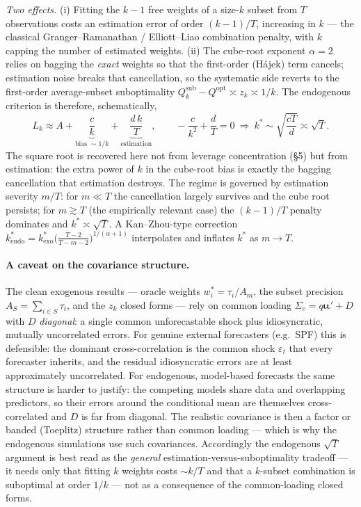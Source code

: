 \documentclass[11pt]{article}
\newcommand{\Sig}{\Sigma_e}
\newcommand{\Qopt}{Q^{\mathrm{opt}}}
\newcommand{\Qsub}{Q_k^{\mathrm{sub}}}
\newcommand{\iotab}{\bm{\iota}}
\begin{document}
\emph{Two effects.} (i) Fitting the $k-1$ free weights of a size-$k$ subset from $T$
observations costs an estimation error of order $(k-1)/T$, increasing in $k$ --- the
classical Granger--Ramanathan / Elliott--Liao combination penalty, with $k$ capping the
number of estimated weights. (ii) The cube-root exponent $\alpha=2$ relies on bagging the
\emph{exact} weights so that the first-order (H\'ajek) term cancels; estimation noise breaks
that cancellation, so the systematic side reverts to the first-order average-subset
suboptimality $\Qsub-\Qopt\asymp z_k\asymp1/k$. The endogenous criterion is therefore,
schematically,
\[
  L_k\approx A+\underbrace{\frac{c}{k}}_{\text{bias }\sim1/k}
  +\underbrace{\frac{d\,k}{T}}_{\text{estimation}},\qquad
  -\frac{c}{k^2}+\frac{d}{T}=0\ \Longrightarrow\ k^\ast\sim\sqrt{\frac{cT}{d}}\asymp\sqrt T .
\]
The square root is recovered here not from leverage concentration (\S5) but from estimation:
the extra power of $k$ in the cube-root bias is exactly the bagging cancellation that
estimation destroys. The regime is governed by estimation severity $m/T$: for $m\ll T$ the
cancellation largely survives and the cube root persists; for $m\gtrsim T$ (the empirically
relevant case) the $(k-1)/T$ penalty dominates and $k^\ast\asymp\sqrt T$. A Kan--Zhou-type
correction $k^\ast_{\mathrm{endo}}=k^\ast_{\mathrm{exo}}\big(\frac{T-2}{T-m-2}\big)^{1/(\alpha+1)}$
interpolates and inflates $k^\ast$ as $m\to T$.

\paragraph{A caveat on the covariance structure.} The clean exogenous results --- oracle
weights $w_i^\ast=\tau_i/A_m$, the subset precision $A_S=\sum_{i\in S}\tau_i$, and the $z_k$
closed forms --- rely on common loading $\Sig=q\iotab\iotab'+D$ with $D$ \emph{diagonal}: a
single common unforecastable shock plus idiosyncratic, mutually uncorrelated errors. For
genuine external forecasters (e.g.\ SPF) this is defensible: the dominant cross-correlation is
the common shock $\varepsilon_t$ that every forecaster inherits, and the residual
idiosyncratic errors are at least approximately uncorrelated. For endogenous, model-based
forecasts the same structure is harder to justify: the competing models share data and
overlapping predictors, so their errors around the conditional mean are themselves
cross-correlated and $D$ is far from diagonal. The realistic covariance is then a factor or
banded (Toeplitz) structure rather than common loading --- which is why the endogenous
simulations use such covariances. Accordingly the endogenous $\sqrt T$ argument is best read
as the \emph{general} estimation-versus-suboptimality tradeoff --- it needs only that fitting
$k$ weights costs $\sim k/T$ and that a $k$-subset combination is suboptimal at order $1/k$
--- not as a consequence of the common-loading closed forms.
\end{document}
